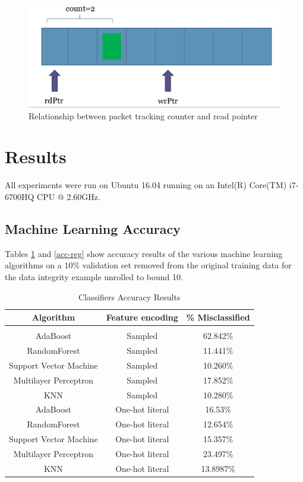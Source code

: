 \documentclass[letterpaper]{article} %
\begin{document}
\begin{figure}
\begin{center}
  \includegraphics[scale=0.15]{magicpacket.png}
  \caption{Relationship between packet tracking counter and read pointer}
  \label{mp}
\end{center}
\end{figure}

\section{Results}

All experiments were run on Ubuntu 16.04 running on an Intel(R) Core(TM) i7-6700HQ CPU @ 2.60GHz.

\subsection{Machine Learning Accuracy}

Tables \ref{acc-class} and \ref{acc-reg} show accuracy results of the various machine learning algorithms on a $10\%$ validation set removed from the original training data for the data integrity example unrolled to bound 10.

\begin{table}[h!]
\centering
\begin{tabular}{ c | c | c }
Algorithm & Feature encoding & \% Misclassified \\
\hline \\
AdaBoost & Sampled & 62.842\% \\
RandomForest & Sampled & 11.441\% \\
Support Vector Machine & Sampled & 10.260\% \\
Multilayer Perceptron & Sampled & 17.852\% \\
KNN & Sampled & 10.280\% \\ 
AdaBoost & One-hot literal & 16.53\%\\
RandomForest & One-hot literal & 12.654\% \\
Support Vector Machine & One-hot literal & 15.357\% \\
Multilayer Perceptron & One-hot literal & 23.497\% \\
KNN & One-hot literal & 13.8987\% 
\end{tabular}
\caption{Classifiers Accuracy Results}
\label{acc-class}
\end{table}
\end{document}
